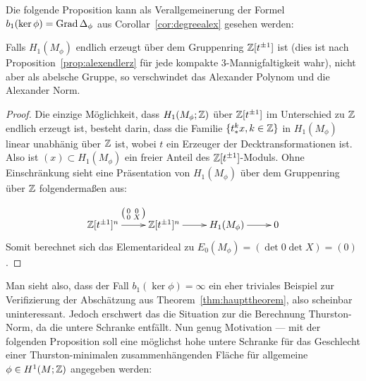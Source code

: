     Die folgende Proposition kann als Verallgemeinerung der Formel $b_1(\ker\phi)=\operatorname{Grad}\Delta_\phi$ aus Corollar~\ref{cor:degreealex} gesehen werden:
    \begin{prop}
    	Falls $H_1(M_\phi)$ endlich erzeugt über dem Gruppenring $\mathbb{Z}[t^{\pm 1}]$ ist (dies ist nach Proposition~\ref{prop:alexendlerz} für jede kompakte 3-Mannigfaltigkeit wahr), nicht aber als abelsche Gruppe, so verschwindet das Alexander Polynom und die Alexander Norm.%
    \end{prop}
    \begin{proof}
    	Die einzige Möglichkeit, dass $H_1(M_\phi;\mathbb{Z})$ über $\mathbb{Z}[t^{\pm 1}]$ im Unterschied zu $\mathbb{Z}$ endlich erzeugt ist, besteht darin, dass die Familie $\{t_*^kx,k\in\mathbb{Z}\}$ in $H_1(M_\phi)$ linear unabhänig über $\mathbb{Z}$ ist, wobei $t$ ein Erzeuger der Decktransformationen ist. Also ist $(x)\subset H_1(M_\phi)$ ein freier Anteil des $\mathbb{Z}[t^{\pm 1}]$-Moduls. Ohne Einschränkung sieht eine Präsentation von $H_1(M_\phi)$ über dem Gruppenring über $\mathbb{Z}$ folgendermaßen aus:
    	\[
    		\begin{xy}
    			\xymatrix@L+3pt{\laurent \ZZ t ^n \ar[r]^{\bigl(\begin{smallmatrix}0&0\\0&X\end{smallmatrix}\bigr)} & \laurent \ZZ t ^n \ar[r] &H_1(M_\phi) \ar[r] &0}
    		\end{xy}
    	\]
    	Somit berechnet sich das Elementarideal zu $E_0(M_\phi)=(\det 0\det X)=(0)$.%
    \end{proof}

    Man sieht also, dass der Fall $b_1(\ker\phi)=\infty$ ein eher triviales Beispiel zur Verifizierung der Abschätzung aus Theorem~\ref{thm:haupttheorem}, also scheinbar uninteressant. Jedoch erschwert das die Situation zur die Berechnung Thurston-Norm, da die untere Schranke entfällt. Nun genug Motivation --- mit der folgenden Proposition soll eine möglichst hohe untere Schranke für das Geschlecht einer Thurston-minimalen zusammenhängenden Fläche für allgemeine $\phi\in H^1(M;\mathbb{Z})$ angegeben werden:

